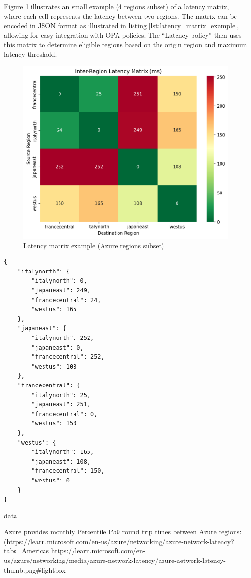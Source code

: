 Figure \ref{fig:latency_matrix} illustrates an small example (4 regions subset) of a latency matrix, where each cell represents the latency between two regions. The matrix can be encoded in JSON format as illustrated in listing \ref{lst:latency_matrix_example}, allowing for easy integration with OPA policies. The ``Latency policy'' then uses this matrix to determine eligible regions based on the origin region and maximum latency threshold.

\begin{figure}[H]
  \centering
  \includegraphics[width=0.75\linewidth]{images/latency_heatmap.png}
  \caption{Latency matrix example (Azure regions subset)}
  \label{fig:latency_matrix}
\end{figure}


\lstset{style=jsonstyle}
\begin{lstlisting}[caption={Latancy matrix example encoded in JSON format}, label={lst:latency_matrix_example}]
  {
    "italynorth": {
        "italynorth": 0,
        "japaneast": 249,
        "francecentral": 24,
        "westus": 165
    },
    "japaneast": {
        "italynorth": 252,
        "japaneast": 0,
        "francecentral": 252,
        "westus": 108
    },
    "francecentral": {
        "italynorth": 25,
        "japaneast": 251,
        "francecentral": 0,
        "westus": 150
    },
    "westus": {
        "italynorth": 165,
        "japaneast": 108,
        "francecentral": 150,
        "westus": 0
    }
}

\end{lstlisting}


data

Azure provides monthly Percentile P50 round trip times between Azure regions:
(https://learn.microsoft.com/en-us/azure/networking/azure-network-latency?tabs=Americas%
https://learn.microsoft.com/en-us/azure/networking/media/azure-network-latency/azure-network-latency-thumb.png#lightbox 

